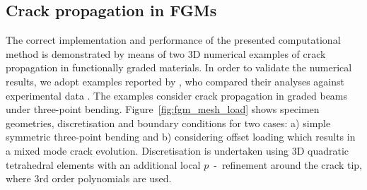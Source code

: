 \documentclass[onecolumn]{svjour3}
\begin{document}
\subsection{Crack propagation in FGMs} \label{sec:crack_propagation_FGM} 
% 
The correct implementation and performance of the presented computational method is demonstrated by means of two 3D numerical examples of crack propagation in functionally graded materials. In order to validate the numerical results, we adopt examples reported by \cite{kim2004simulation}, who compared their analyses against experimental data \cite{galvez1996crack, rousseau2000compositionally}. The examples consider crack propagation in graded beams under three-point bending. Figure~\ref{fig:fgm_mesh_load} shows specimen geometries, discretisation and boundary conditions for two cases: a) simple symmetric three-point bending and b) considering offset loading which results in a mixed mode crack evolution. Discretisation is undertaken using 3D quadratic tetrahedral elements with an additional local $p$~-~refinement around the crack tip, where 3rd order polynomials are used. 
\end{document}
